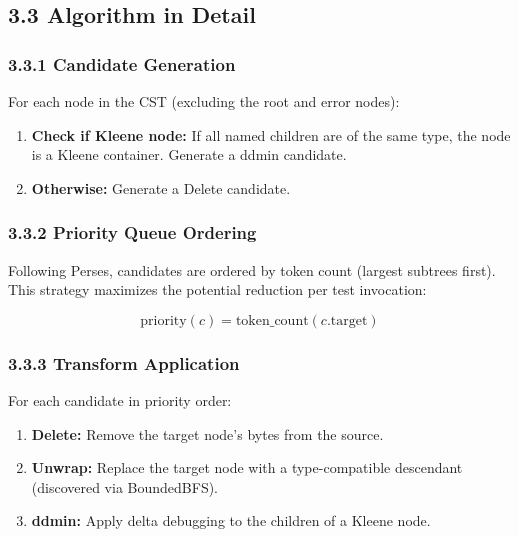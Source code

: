 \documentclass[
  letterpaper,
]{article}
\providecommand{\tightlist}{%
  \setlength{\itemsep}{0pt}\setlength{\parskip}{0pt}}
\begin{document}
\subsection{3.3 Algorithm in Detail}\label{algorithm-in-detail}

\subsubsection{3.3.1 Candidate Generation}\label{candidate-generation}

For each node in the CST (excluding the root and error nodes):

\begin{enumerate}
\def\labelenumi{\arabic{enumi}.}
\tightlist
\item
  \textbf{Check if Kleene node:} If all named children are of the same
  type, the node is a Kleene container. Generate a ddmin candidate.
\item
  \textbf{Otherwise:} Generate a Delete candidate.
\end{enumerate}

\subsubsection{3.3.2 Priority Queue
Ordering}\label{priority-queue-ordering}

Following Perses, candidates are ordered by token count (largest
subtrees first). This strategy maximizes the potential reduction per
test invocation:

\[
\text{priority}(c) = \text{token\_count}(c.\text{target})
\]

\subsubsection{3.3.3 Transform Application}\label{transform-application}

For each candidate in priority order:

\begin{enumerate}
\def\labelenumi{\arabic{enumi}.}
\tightlist
\item
  \textbf{Delete:} Remove the target node's bytes from the source.
\item
  \textbf{Unwrap:} Replace the target node with a type-compatible
  descendant (discovered via BoundedBFS).
\item
  \textbf{ddmin:} Apply delta debugging to the children of a Kleene
  node.
\end{enumerate}
\end{document}
